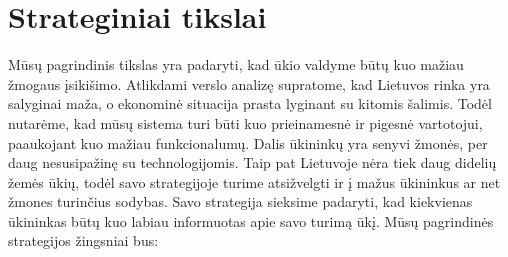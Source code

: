 \documentclass[oneside]{VUMIFPSkursinis}
\begin{document}
\section{Strateginiai tikslai}
	Mūsų pagrindinis tikslas yra padaryti, kad ūkio valdyme būtų kuo mažiau žmogaus įsikišimo. Atlikdami verslo analizę supratome, kad Lietuvos rinka yra salyginai maža, o ekonominė situacija prasta lyginant su kitomis šalimis. Todėl nutarėme, kad mūsų sistema turi būti kuo prieinamesnė ir pigesnė vartotojui, paaukojant kuo mažiau funkcionalumų. Dalis ūkininkų yra senyvi žmonės, per daug nesusipažinę su technologijomis. Taip pat Lietuvoje nėra tiek daug didelių žemės ūkių, todėl savo strategijoje turime atsižvelgti ir į mažus ūkininkus ar net žmones turinčius sodybas. Savo strategija sieksime padaryti, kad kiekvienas ūkininkas būtų kuo labiau informuotas apie savo turimą ūkį. Mūsų pagrindinės strategijos žingsniai bus:
\end{document}
